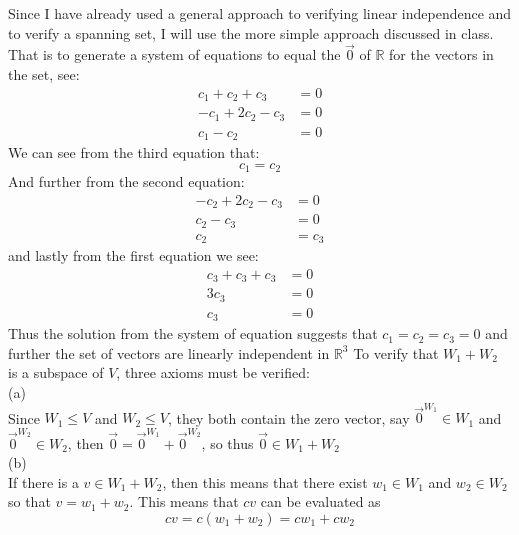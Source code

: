 \documentclass{report}
\begin{document}
\sol Since I have already used a general approach to verifying linear independence and to verify a spanning set, I will use the more simple approach discussed in class. That is to generate a system of equations to equal the $\vec{0}$ of $\mathbb{R}$ for the vectors in the set, see:
\begin{align*}
c_1 + c_2 + c_3 & = 0 \\
-c_1 + 2 c_2 - c_3 & = 0 \\
c_1 - c_2 & = 0
\end{align*}
We can see from the third equation that:
$$c_1 = c_2$$
And further from the second equation:
\begin{align*}
-c_2 + 2 c_2 - c_3 & = 0 \\
c_2 - c_3 & = 0 \\
c_2 & = c_3 
\end{align*}
and lastly from the first equation we see:
\begin{align*}
c_3 + c_3 + c_3 & = 0 \\
3c_3 & = 0 \\
c_3 & = 0
\end{align*}
Thus the solution from the system of equation suggests that $c_1 = c_2 = c_3 = 0$ and further the set of vectors are linearly independent in $\mathbb{R}^3$
\sol To verify that $W_1 + W_2$ is a subspace of $V$, three axioms must be verified: \\
(a) \\
Since $W_1 \le V$ and $W_2 \le V$, they both contain the zero vector, say $\vec{0}^{W_1} \in W_1$ and $\vec{0}^{W_2} \in W_2$, then $\vec{0} = \vec{0}^{W_1} + \vec{0}^{W_2}$, so thus $\vec{0}\in W_1 + W_2$ \\
(b) \\
If there is a $v \in W_1 + W_2$, then this means that there exist $w_1 \in W_1$ and $w_2 \in W_2$ so that $v = w_1 + w_2$.
This means that $cv$ can be evaluated as $$cv = c(w_1 + w_2) = cw_1 + cw_2$$
\end{document}
